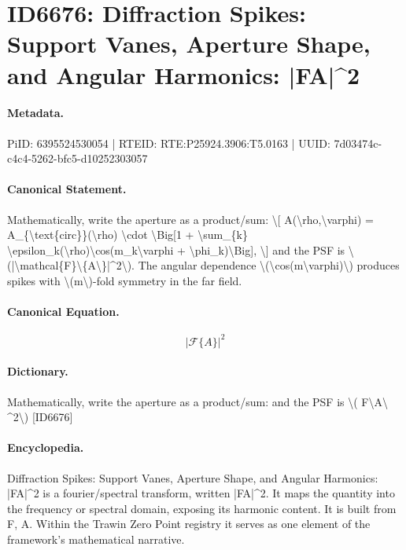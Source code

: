 \section*{ID6676: Diffraction Spikes: Support Vanes, Aperture Shape, and Angular Harmonics: |FA|\textasciicircum{}2}
\paragraph{Metadata.}
PiID: 6395524530054 | RTEID: RTE:P25924.3906:T5.0163 | UUID: 7d03474c-c4c4-5262-bfc5-d10252303057

\paragraph{Canonical Statement.}
Mathematically, write the aperture as a product/sum: \textbackslash{}[ A(\textbackslash{}rho,\textbackslash{}varphi) = A\_\{\textbackslash{}text\{circ\}\}(\textbackslash{}rho) \textbackslash{}cdot \textbackslash{}Big[1 + \textbackslash{}sum\_\{k\} \textbackslash{}epsilon\_k(\textbackslash{}rho)\textbackslash{}cos(m\_k\textbackslash{}varphi + \textbackslash{}phi\_k)\textbackslash{}Big], \textbackslash{}] and the PSF is \textbackslash{}(|\textbackslash{}mathcal\{F\}\textbackslash{}\{A\textbackslash{}\}|\textasciicircum{}2\textbackslash{}). The angular dependence \textbackslash{}(\textbackslash{}cos(m\textbackslash{}varphi)\textbackslash{}) produces spikes with \textbackslash{}(m\textbackslash{})-fold symmetry in the far field.

\paragraph{Canonical Equation.}
\[
|\mathcal{F}\{A\}|^2
\]

\paragraph{Dictionary.}
Mathematically, write the aperture as a product/sum: and the PSF is \textbackslash{}( F\textbackslash{}A\textbackslash{} \textasciicircum{}2\textbackslash{}) [ID6676]

\paragraph{Encyclopedia.}
Diffraction Spikes: Support Vanes, Aperture Shape, and Angular Harmonics: |FA|\textasciicircum{}2 is a fourier/spectral transform, written |FA|\textasciicircum{}2. It maps the quantity into the frequency or spectral domain, exposing its harmonic content. It is built from F, A. Within the Trawin Zero Point registry it serves as one element of the framework's mathematical narrative.
